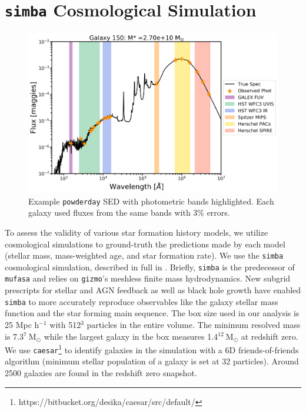 \documentclass[twocolumn]{aastex62}
\begin{document}
\section{\texttt{simba} Cosmological Simulation} 


\begin{figure}
    \centering
    \includegraphics[width = \textwidth]{fancySED_150.png}
    \caption{Example \texttt{powderday} SED with photometric bands highlighted. Each galaxy used fluxes from the same bands with 3\% errors. }
    \label{fig:SED}
\end{figure}

To assess the validity of various star formation history models, we utilize cosmological simulations to ground-truth the predictions made by each model (stellar mass, mass-weighted age, and star formation rate). We use the \texttt{simba} cosmological simulation, described in full in \cite{dave_simba:_2019}. Briefly, \texttt{simba} is the predecessor of \texttt{mufasa} and relies on \texttt{gizmo}'s meshless finite mass hydrodynamics. New subgrid prescripts for stellar and AGN feedback as well as black hole growth have enabled \texttt{simba} to more accurately reproduce observables like the galaxy stellar mass function and the star forming main sequence. The box size used in our analysis is 25 Mpc h$^{-1}$ with 512$^3$ particles in the entire volume. The minimum resolved mass is 7.3$^7 \: \mathrm{M}_{\odot}$ while the largest galaxy in the box measures 1.4$^{12} \: \mathrm{M}_{\odot}$ at redshift zero. We use \texttt{caesar}\footnote{https://bitbucket.org/desika/caesar/src/default/} to identify galaxies in the simulation with a 6D friends-of-friends algorithm (minimum stellar population of a galaxy is set at 32 particles). Around 2500 galaxies are found in the redshift zero snapshot. 
\end{document}
